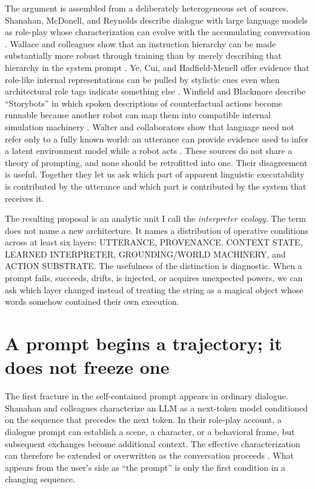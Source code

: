 \documentclass[11pt]{article}
\newcommand{\layer}[1]{\textsf{\MakeUppercase{#1}}}
\begin{document}
The argument is assembled from a deliberately heterogeneous set of sources. Shanahan, McDonell, and Reynolds describe dialogue with large language models as role-play whose characterization can evolve with the accumulating conversation \parencite{shanahan2023roleplay}. Wallace and colleagues show that an instruction hierarchy can be made substantially more robust through training than by merely describing that hierarchy in the system prompt \parencite{wallace2024instruction}. Ye, Cui, and Hadfield-Menell offer evidence that role-like internal representations can be pulled by stylistic cues even when architectural role tags indicate something else \parencite{ye2026roleconfusion}. Winfield and Blackmore describe ``Storybots'' in which spoken descriptions of counterfactual actions become runnable because another robot can map them into compatible internal simulation machinery \parencite{winfield2022artificialculture}. Walter and collaborators show that language need not refer only to a fully known world: an utterance can provide evidence used to infer a latent environment model while a robot acts \parencite{walter2021language}. These sources do not share a theory of prompting, and none should be retrofitted into one. Their disagreement is useful. Together they let us ask which part of apparent linguistic executability is contributed by the utterance and which part is contributed by the system that receives it.

The resulting proposal is an analytic unit I call the \emph{interpreter ecology}. The term does not name a new architecture. It names a distribution of operative conditions across at least six layers: \layer{utterance}, \layer{provenance}, \layer{context state}, \layer{learned interpreter}, \layer{grounding/world machinery}, and \layer{action substrate}. The usefulness of the distinction is diagnostic. When a prompt fails, succeeds, drifts, is injected, or acquires unexpected powers, we can ask which layer changed instead of treating the string as a magical object whose words somehow contained their own execution.

\section{A prompt begins a trajectory; it does not freeze one}

The first fracture in the self-contained prompt appears in ordinary dialogue. Shanahan and colleagues characterize an LLM as a next-token model conditioned on the sequence that precedes the next token. In their role-play account, a dialogue prompt can establish a scene, a character, or a behavioral frame, but subsequent exchanges become additional context. The effective characterization can therefore be extended or overwritten as the conversation proceeds \parencite{shanahan2023roleplay}. What appears from the user's side as ``the prompt'' is only the first condition in a changing sequence.
\end{document}
